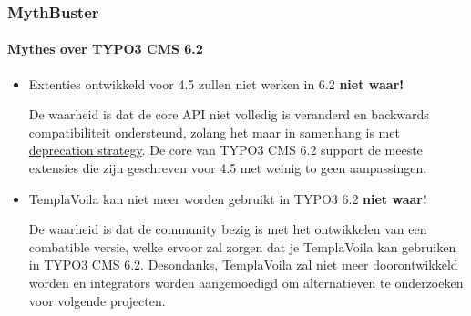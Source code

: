 
\begin{frame}[fragile]
	\frametitle{MythBuster}
	\framesubtitle{Mythes over TYPO3 CMS 6.2}

	\begin{itemize}
		\item Extenties ontwikkeld voor 4.5 zullen niet werken in 6.2\newline
			\tabto{8.4cm}\color{red}\textbf{\textrightarrow niet waar!}\color{black}

			\smaller
				De waarheid is dat de core API niet volledig is veranderd en backwards compatibiliteit ondersteund, zolang het maar in samenhang is met \href{http://forge.typo3.org/projects/typo3v4-core/wiki/CoreDevPolicy}{deprecation strategy}. De core van TYPO3 CMS 6.2 support de meeste extensies die zijn geschreven voor 4.5 met weinig to geen aanpassingen.
			\normalsize

		\item TemplaVoila kan niet meer worden gebruikt in TYPO3 6.2\newline
			\tabto{8.4cm}\color{red}\textbf{\textrightarrow niet waar!}\color{black}

			\smaller
				De waarheid is dat de community bezig is met het ontwikkelen van een combatible versie, welke ervoor zal zorgen dat je TemplaVoila kan gebruiken in TYPO3 CMS 6.2. Desondanks, TemplaVoila zal niet meer doorontwikkeld worden en integrators worden aangemoedigd om alternatieven te onderzoeken voor volgende projecten.
			\normalsize

	\end{itemize}

\end{frame}


